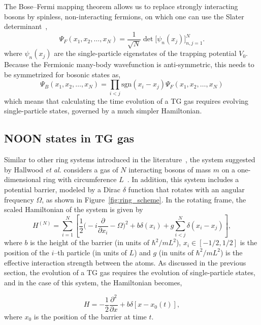 \noindent The Bose--Fermi mapping theorem allows us to replace strongly interacting bosons by spinless, non-interacting fermions, on which one can use the Slater determinant~\cite{slater1929},
\begin{equation}
\Psi_F (x_1, x_2, \ldots, x_N) = \frac{1}{\sqrt{N}} \det\Big[\psi_n(x_j)\Big]_{n,j=1}^N.
\end{equation}
\noindent where $\psi_n(x_j)$ are the single-particle eigenstates of the trapping potential $V_0$.
Because the Fermionic many-body wavefunction is anti-symmetric, this needs to be symmetrized for bosonic states as, 
\begin{equation}
\Psi_B(x_1, x_2, \ldots, x_N) =
\prod_{i < j}
\mathrm{sgn}(x_i - x_j)\Psi_F(x_1, x_2, \ldots, x_N)
\end{equation}
\noindent which means that calculating the time evolution of a TG gas requires evolving single-particle states, governed by a much simpler Hamiltonian.

\subsection{NOON states in TG gas}
\label{sec:controltro}

Similar to other ring systems introduced in the literature~\cite{das2002,girardeau2009}, the system suggested by Hallwood \textit{et al.} considers a gas of $N$ interacting bosons of mass $m$ on a one-dimensional ring with circumference $L$~\cite{hallwood2010}.
In addition, this system includes a potential barrier, modeled by a Dirac $\delta$ function that rotates with an angular frequency $\Omega$, as shown in Figure~\ref{fig:ring_scheme}.
In the rotating frame, the scaled Hamiltonian of the system is given by \cite{hallwood2010}
\begin{equation}H^{(N)} = \sum_{i=1} ^{N} \left[{\frac{1}{2}\bigg(-i\frac{\partial}{\partial x_i}-\Omega}\bigg)^2 + b\delta(x_i) +g \sum_{i<j} ^{N} \delta (x_i - x_j )\right],
\end{equation}
\noindent where $b$ is the height of the barrier (in units of $\hbar^2/mL^2$), $x_i \in \left[-1/2,1/2\right]$ is the position of the $i$--th particle (in units of $L$) and $g$ (in units of $\hbar^2/mL^2$) is the effective interaction strength between the atoms.
As discussed in the previous section, the evolution of a TG gas requires the evolution of single-particle states, and in the case of this system, the Hamiltonian becomes,

\begin{equation}
H = -\frac{1}{2} \frac{\partial^2}{\partial x} + b\delta \left[ x-x_0(t) \right], 
\end{equation}
where $x_0$ is the position of the barrier at time $t$. 

